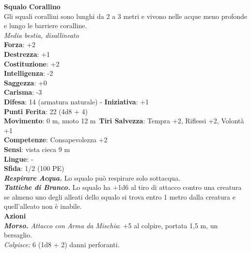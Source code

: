 \begin{multicols}{2}
\medskip\textbf{Squalo Corallino}\\
Gli squali corallini sono lunghi da 2 a 3 metri e vivono  nelle acque meno profonde e lungo le barriere coralline.\\
\emph{Media bestia, disallineato}\\
\textbf{Forza}: +2\\
\textbf{Destrezza}: +1\\
\textbf{Costituzione}: +2\\
\textbf{Intelligenza}: -2\\
\textbf{Saggezza}: +0\\
\textbf{Carisma}: -3\\
\textbf{Difesa}: 14 (armatura naturale) - \textbf{Iniziativa}: +1\\
\textbf{Punti Ferita}: 22 (4d8 + 4)\\
\textbf{Movimento}: 0 m, nuoto 12 m\
\textbf{Tiri Salvezza}: Tempra +2, Riflessi +2, Volontà +1\\
\textbf{Competenze}: Consapevolezza +2\\
\textbf{Sensi}: vista cieca 9 m\\
\textbf{Lingue}: -\\
\textbf{Sfida}: 1/2 (100 PE)\smallskip\\
\emph{\textbf{Respirare Acqua.}} Lo squalo può respirare solo sottacqua.\\
\emph{\textbf{Tattiche di Branco.}} Lo squalo ha +1d6 al tiro di attacco contro una creatura se almeno uno degli alleati dello squalo si  trova entro 1 metro dalla creatura e quell'alleato non è inabile.\\
\smallskip\textbf{Azioni}\\
\emph{\textbf{Morso.} Attacco con Arma da Mischia}: +5 al colpire, portata 1,5 m, un bersaglio.\\
\emph{Colpisce:} 6 (1d8 + 2) danni perforanti.\\


\end{multicols}

